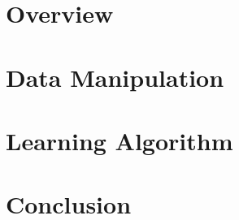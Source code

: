 \documentclass[12pt]{article}
\begin{document}

\tableofcontents

\section{Overview}
\section{Data Manipulation}
\section{Learning Algorithm}
\section{Conclusion}
\end{document}

